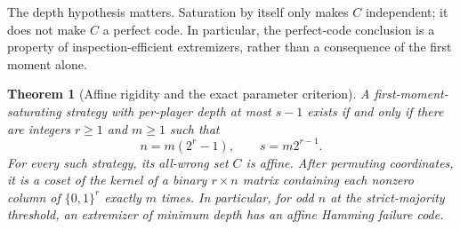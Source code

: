\documentclass[11pt,letterpaper]{article}
\newtheorem{theorem}{Theorem}[section]
\theoremstyle{definition}
\begin{document}
The depth hypothesis matters.  Saturation by itself only makes $C$
independent; it does not make $C$ a perfect code.  In particular, the
perfect-code conclusion is a property of inspection-efficient
extremizers, rather than a consequence of the first moment alone.

\begin{theorem}[Affine rigidity and the exact parameter criterion]
\label{mbg:insp:thm:fin-affine}
A first-moment-saturating strategy with per-player depth at most $s-1$
exists if and only if there are integers $r\geq1$ and $m\geq1$ such that
\begin{equation}
 n=m(2^r-1),\qquad s=m2^{r-1}.
 \label{mbg:insp:eq:fin-parameters}
\end{equation}
For every such strategy, its all-wrong set $C$ is affine.  After
permuting coordinates, it is a coset of the kernel of a binary
$r\times n$ matrix containing each nonzero column of $\{0,1\}^r$
exactly $m$ times.  In particular, for odd $n$ at the strict-majority
threshold, an extremizer of minimum depth has an affine Hamming failure
code.
\end{theorem}
\end{document}
